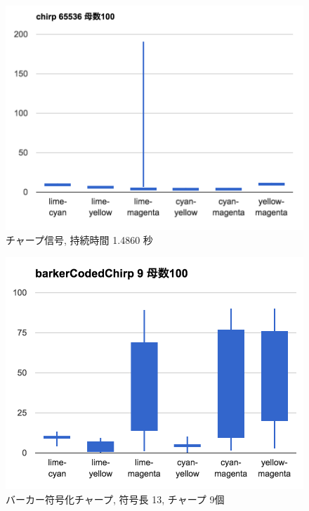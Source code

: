 \begin{figure}[p]
  \centering
  \includegraphics[clip,width=1.05\hsize]{img/c65536.png}
  \caption{チャープ信号, 持続時間 1.4860 秒}\label{fig:c65536}
\end{figure}



\clearpage



\begin{figure}[p]
  \centering
  \includegraphics[clip,width=1.05\hsize]{img/bcc9.png}
  \caption{バーカー符号化チャープ, 符号長 13, チャープ 9個}\label{fig:bcc9}
\end{figure}

